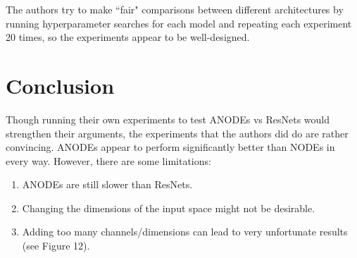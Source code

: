 \documentclass[letterpaper,12 pt]{article}
\begin{document}
\noindent The authors try to make ``fair" comparisons between different architectures by running hyperparameter searches for each model and repeating each experiment 20 times, so the experiments appear to be well-designed.	

\section{Conclusion}
Though running their own experiments to test ANODEs vs ResNets would strengthen their arguments, the experiments that the authors did do are rather convincing. ANODEs appear to perform significantly better than NODEs in every way. However, there are some limitations: 
\begin{enumerate}
    \item ANODEs are still slower than ResNets.
    \item Changing the dimensions of the input space might not be desirable.
    \item Adding too many channels/dimensions can lead to very unfortunate results (see Figure 12). 
\end{enumerate}
\end{document}
